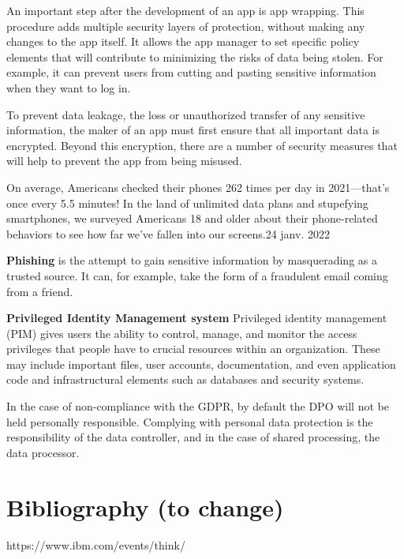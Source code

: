 \begin{itemize}
An important step after the development of an app is app wrapping. This procedure adds multiple security layers of protection, without making any changes to the app itself. It allows the app manager to set specific policy elements that will contribute to minimizing the risks of data being stolen. For example, it can prevent users from cutting and pasting sensitive information when they want to log in.

\blindtext




To prevent data leakage, the loss or unauthorized transfer of any sensitive information, the maker of an app must first ensure that all important data is encrypted. Beyond this encryption, there are a number of security measures that will help to prevent the app from being misused.



On average, Americans checked their phones 262 times per day in 2021—that's once every 5.5 minutes! In the land of unlimited data plans and stupefying smartphones, we surveyed Americans 18 and older about their phone-related behaviors to see how far we've fallen into our screens.24 janv. 2022

 \textbf{Phishing} is the attempt to gain sensitive information by masquerading as a trusted source. It can, for example, take the form of a fraudulent email coming from a friend.


 \textbf{Privileged Identity Management system}
 Privileged identity management (PIM) gives users the ability to control, manage, and monitor the access privileges that people have to crucial resources within an organization. These may include important files, user accounts, documentation, and even application code and infrastructural elements such as databases and security systems.



In the case of non-compliance with the GDPR, by default the DPO will not be held personally responsible. Complying with personal data protection is the responsibility of the data controller, and in the case of shared processing, the data processor.


\section{Bibliography (to change)}
https://www.ibm.com/events/think/
\blindtext
\end{itemize}


